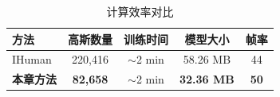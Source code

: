 \begin{table}[t]
    \centering\small
    \caption{计算效率对比}
    \label{tab:efficiency}
    \renewcommand{\arraystretch}{1.2} 
    \setlength{\tabcolsep}{10pt}
    \begin{tabular}{lcccc}
        \toprule
        方法 & 高斯数量 & 训练时间 & 模型大小 & 帧率 \\
        \midrule
        IHuman & 220,416 & $\sim$2 min & 58.26 MB & 44 \\
        \textbf{本章方法} & \textbf{82,658} & $\sim$2 min & \textbf{32.36 MB} & \textbf{50} \\
        \bottomrule
    \end{tabular}
\end{table}
